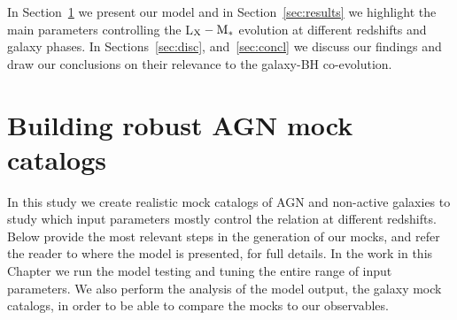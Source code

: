 In Section~\ref{sec:model} we present our model and in Section~\ref{sec:results} we highlight the main parameters controlling the L$_{\rm X}-{\rm M}_*$ evolution at different redshifts and galaxy phases.
In Sections~\ref{sec:disc}, and~\ref{sec:concl} we discuss our findings and draw our conclusions on their relevance to the galaxy-BH co-evolution.

\section{Building robust AGN mock catalogs}\label{sec:model}
In this study we create realistic mock catalogs of AGN and non-active galaxies to study which input parameters mostly control the \LXMS{} relation at different redshifts. Below provide the most relevant steps in the generation of our mocks, and refer the reader to \citet{Allevato21} where the model is presented, for full details. In the work in this Chapter we run the model testing and tuning the entire range of input parameters. We also perform the analysis of the model output, the galaxy mock catalogs, in order to be able to compare the mocks to our observables.

